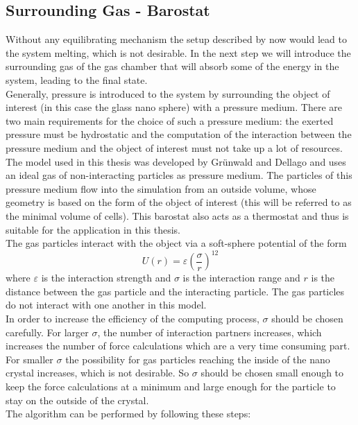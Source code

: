 \documentclass[12pt]{article}
\begin{document}
\subsection{Surrounding Gas - Barostat}
Without any equilibrating mechanism the setup described by now would lead to the system melting, which is not desirable. In the next step we will 
introduce the surrounding gas of the gas chamber that will absorb some of the energy in the system, leading to the final state.\\
Generally, pressure is introduced to the system by surrounding the object of interest (in this case the glass nano sphere) with a pressure medium.
There are two main requirements for the choice of such a pressure medium: the exerted pressure must be hydrostatic and the computation of the
interaction between the pressure medium and the object of interest must not take up a lot of resources.\\
The model used in this thesis was developed by Gr\"unwald and Dellago \cite{Gruenwald2006} and uses an ideal gas of non-interacting particles as
pressure medium. The particles of this pressure medium flow into the simulation from an outside volume, whose geometry is based on the form of the
object of interest (this will be referred to as the minimal volume of cells). This barostat also acts as a thermostat and thus is suitable for the 
application in this thesis.\\
The gas particles interact with the object via a soft-sphere potential of the form
\begin{equation}
    \label{eq:softsphere}
    U(r) = \varepsilon \left(\frac{\sigma}{r}\right)^{12}
\end{equation}
where $\varepsilon$ is the interaction strength and $\sigma$ is the interaction range and $r$ is the distance between the gas particle and the
interacting particle. The gas particles do not interact with one another in this model.\\
In order to increase the efficiency of the computing process, $\sigma$ should be chosen carefully. For larger $\sigma$, the number of interaction
partners increases, which increases the number of force calculations which are a very time consuming part. For smaller $\sigma$ the possibility for
gas particles reaching the inside of the nano crystal increases, which is not desirable. So $\sigma$ should be chosen small enough to keep the force
calculations at a minimum and large enough for the particle to stay on the outside of the crystal.\\ 
The algorithm can be performed by following these steps:
\end{document}
